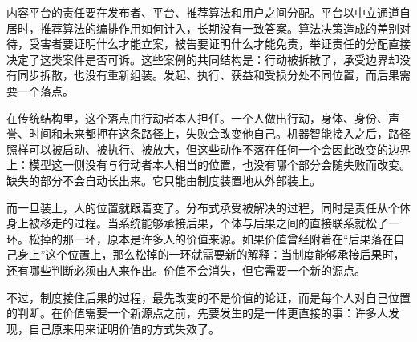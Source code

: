 内容平台的责任要在发布者、平台、推荐算法和用户之间分配。平台以中立通道自居时，推荐算法的编排作用如何计入，长期没有一致答案。算法决策造成的差别对待，受害者要证明什么才能立案，被告要证明什么才能免责，举证责任的分配直接决定了这类案件是否可诉。这些案例的共同结构是：行动被拆散了，承受边界却没有同步拆散，也没有重新组装。发起、执行、获益和受损分处不同位置，而后果需要一个落点。

在传统结构里，这个落点由行动者本人担任。一个人做出行动，身体、身份、声誉、时间和未来都押在这条路径上，失败会改变他自己。机器智能接入之后，路径照样可以被启动、被执行、被放大，但这些动作不落在任何一个会因此改变的边界上：模型这一侧没有与行动者本人相当的位置，也没有哪个部分会随失败而改变。缺失的部分不会自动长出来。它只能由制度装置地从外部装上。

而一旦装上，人的位置就跟着变了。分布式承受被解决的过程，同时是责任从个体身上被移走的过程。当系统能够承接后果，个体与后果之间的直接联系就松了一环。松掉的那一环，原本是许多人的价值来源。如果价值曾经附着在“后果落在自己身上”这个位置上，那么松掉的一环就需要新的解释：当制度能够承接后果时，还有哪些判断必须由人来作出。价值不会消失，但它需要一个新的源点。

不过，制度接住后果的过程，最先改变的不是价值的论证，而是每个人对自己位置的判断。在价值需要一个新源点之前，先要发生的是一件更直接的事：许多人发现，自己原来用来证明价值的方式失效了。
